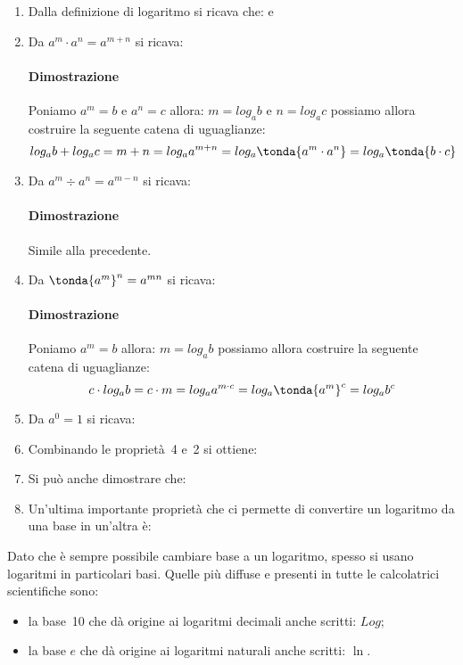 \begin{enumerate} 
 \item Dalla definizione di logaritmo si ricava che:
 e 
 \item Da \quad \(a^m \cdot a^n = a^{m+n}\) \quad si ricava: \quad
\paragraph{Dimostrazione} 
Poniamo \(a^m = b\) e \(a^n = c\) 
allora: \(m = log_a {b}\) e \(n = log_a {c}\) possiamo allora costruire la 
seguente catena di uguaglianze:
\[log_a {b} + log_a {c} =
m + n =  
log_a {a^{m + n}} =
log_a \tonda{{a^m \cdot a^n}}  =
log_a \tonda{{b \cdot c}}\]
 \item Da \quad \(a^m \div a^n = a^{m-n}\) \quad si ricava: \quad
\paragraph{Dimostrazione} Simile alla precedente.\\[4pt]
 \item Da \quad \(\tonda{a^m}^n = a^{mn}\) \quad si ricava: \quad
\paragraph{Dimostrazione} 
Poniamo \(a^m = b\)  
allora: \(m = log_a {b}\) possiamo allora costruire la 
seguente catena di uguaglianze:
\[c \cdot log_a {b} =
c \cdot m = 
log_a {a^{m \cdot c}} =
log_a {\tonda{a^{m}}^c} = 
log_a {b^c}\]
 \item Da \quad \(a^0 = 1\) \quad si ricava: \quad
 \item Combinando le proprietà~4 e~2 si ottiene: \quad
 \item Si può anche dimostrare che: \quad
 \item Un'ultima importante proprietà che ci permette di convertire un 
logaritmo da una base in un'altra è: \quad
\end{enumerate}

\noindent
Dato che è sempre possibile cambiare base a un logaritmo, spesso si 
usano logaritmi in particolari basi. Quelle più diffuse e presenti in tutte le 
calcolatrici scientifiche sono: 
\begin{itemize}
 \item 
la base~10 che dà origine ai logaritmi decimali anche scritti: \(Log\);
 \item 
la base $e$ che dà origine ai logaritmi naturali anche scritti: \(\ln\).
\end{itemize}

